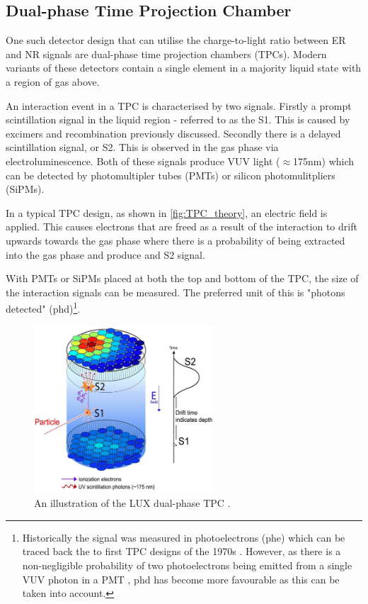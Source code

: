 \subsection{Dual-phase Time Projection Chamber}
\par
One such detector design that can utilise the charge-to-light ratio between ER and NR signals are dual-phase time projection chambers (TPCs).
Modern variants of these detectors contain a single element in a majority liquid state with a region of gas above.
\par
An interaction event in a TPC is characterised by two signals.
Firstly a prompt scintillation signal in the liquid region - referred to as the S1.
This is caused by excimers and recombination previously discussed.
Secondly there is a delayed scintillation signal, or S2.
This is observed in the gas phase via electroluminescence.
Both of these signals produce VUV light ($\approx$175nm) which can be detected by photomultipler tubes (PMTs) or silicon photomulitpliers (SiPMs).
\par
In a typical TPC design, as shown in \autoref{fig:TPC_theory}, an electric field is applied.
This causes electrons that are freed as a result of the interaction to drift upwards towards the gas phase where there is a probability of being extracted into the gas phase and produce and S2 signal.
\par
With PMTs or SiPMs placed at both the top and bottom of the TPC, the size of the interaction signals can be measured.
The preferred unit of this is "photons detected" (phd)\footnote{Historically the signal was measured in photoelectrons (phe) which can be traced back the to first TPC designs of the 1970s \cite{tpc_origins_ref}. However, as there is a non-negligible probability of two photoelectrons being emitted from a single VUV photon in a PMT \cite{pmts_in_xenon_ref}, phd has become more favourable as this can be taken into account.}.

\begin{figure}
    \centering
    \includegraphics[width=0.6\textwidth]{Figures/LZ/tpc_theory.png}
    \caption{An illustration of the LUX dual-phase TPC \cite{lux_ref}.}
    \label{fig:TPC_theory}
\end{figure}

